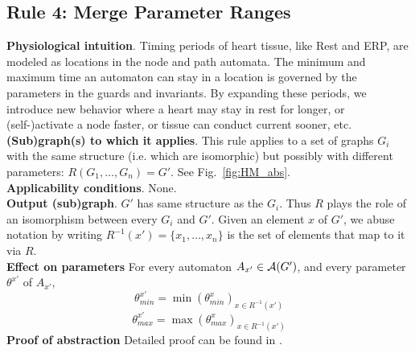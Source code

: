 \subsection{Rule 4: Merge Parameter Ranges}
\textbf{Physiological intuition}. 
Timing periods of heart tissue, like Rest and ERP, are modeled as locations in the node and path automata. 
The minimum and maximum time an automaton can stay in a location is governed by the parameters in the guards and invariants. 
By expanding these periods, we introduce new behavior where a heart may stay in rest for longer, or (self-)activate a node faster, or tissue can conduct current sooner, etc.
\textbf{(Sub)graph(s) to which it applies}.
This rule applies to a set of graphs $G_i$ with the same structure (i.e. which are isomorphic) but possibly with different parameters: $R(G_1,\ldots,G_n) = G'$.
See Fig.~\ref{fig:HM_abs}.\\
\textbf{Applicability conditions}.
None.\\
\textbf{Output (sub)graph}.
$G'$ has same structure as the $G_i$.
Thus $R$ plays the role of an isomorphism between every $G_i$ and $G'$.
Given an element $x$ of $G'$, we abuse notation by writing $R^{-1}(x') = \{x_1,\dots,x_n\}$ is the set of elements that map to it via $R$.\\
\textbf{Effect on parameters}
For every automaton $A_{x'} \in \mathcal{A}(G')$, and every parameter $\theta^{x'}$ of $A_{x'}$, 
\[\theta_{min}^{x'} = \min(\theta^x_{min})_{x \in R^{-1}(x') }\]
\[\theta_{max}^{x'} = \max(\theta^x_{max})_{x \in R^{-1}(x') }\]
\textbf{Proof of abstraction} Detailed proof can be found in \cite{regar_tech}.

%

